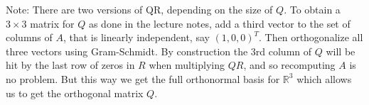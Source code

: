 \documentclass[12pt]{article}
\begin{document}
\begin{enumerate}
Note: There are two versions of QR, depending on the size of $Q$. To obtain a $3\times 3$ matrix for $Q$ as done in the lecture notes, add a third vector to the set of columns of $A$, that is linearly independent, say $(1,0,0)^T$. Then orthogonalize all three vectors using Gram-Schmidt. By construction the 3rd column of $Q$ will be hit by the last row of zeros in $R$ when multiplying $QR$, and so recomputing $A$ is no problem. But this way we get the full orthonormal basis for $\mathbb{R}^3$ which allows us to get the orthogonal matrix $Q$.
\end{enumerate}
\end{document}

